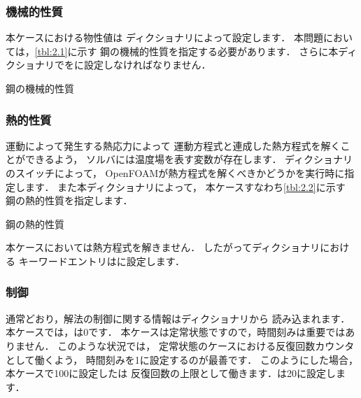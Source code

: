 \subsubsection{機械的性質}
\label{sssec:2.2.1.2}
本ケースにおける物性値は
%
%
ディクショナリによって設定します．
本問題においては，\autoref{tbl:2.1}に示す
鋼の機械的性質を指定する必要があります．
さらに本ディクショナリでをに設定しなければなりません．


\begin{table}[ht]
 
 \caption{鋼の機械的性質}
 \label{tbl:2.1}
\end{table}


\subsubsection{熱的性質}
\label{sssec:2.2.1.3}
運動によって発生する熱応力によって
運動方程式と連成した熱方程式を解くことができるよう，
%
%
ソルバには温度場を表す変数が存在します．
%
%
ディクショナリのスイッチによって，
OpenFOAMが熱方程式を解くべきかどうかを実行時に指定します．
また本ディクショナリによって，
本ケースすなわち\autoref{tbl:2.2}に示す
鋼の熱的性質を指定します．


\begin{table}[ht]
 
 \caption{鋼の熱的性質}
 \label{tbl:2.2}
\end{table}


本ケースにおいては熱方程式を解きません．
したがってディクショナリにおける
キーワードエントリはに設定します．

\subsubsection{制御}
\label{sssec:2.2.1.4}
通常どおり，解法の制御に関する情報はディクショナリから
読み込まれます．本ケースでは，は0です．
本ケースは定常状態ですので，時間刻みは重要ではありません．
このような状況では，
定常状態のケースにおける反復回数カウンタとして働くよう，
時間刻みを1に設定するのが最善です．
このようにした場合，本ケースで100に設定したは
反復回数の上限として働きます．は20に設定します．

